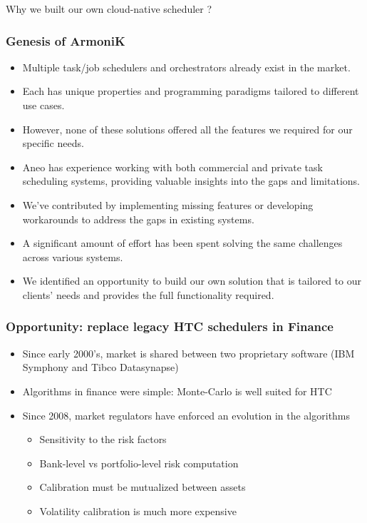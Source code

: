 \documentclass[10pt,aspectratio=1609]{beamer}
\begin{document}
\begin{section}{Why we built our own cloud-native scheduler ?}

  \begin{frame}
    \frametitle{Genesis of ArmoniK}
    \begin{itemize}
      \item Multiple task/job schedulers and orchestrators already exist in the market.
      \item Each has unique properties and programming paradigms tailored to different use cases.
      \item However, none of these solutions offered all the features we required for our specific needs.
      \item Aneo has experience working with both commercial and private task scheduling systems, providing valuable
      insights into the gaps and limitations.
      \item We’ve contributed by implementing missing features or developing workarounds to address the gaps in
      existing systems.
      \item A significant amount of effort has been spent solving the same challenges across various systems.
      \item We identified an opportunity to build our own solution that is tailored to our clients’ needs and provides the
      full functionality required.
    \end{itemize}
  \end{frame}

  \begin{frame}
    \frametitle{Opportunity: replace legacy HTC schedulers in Finance}
    \begin{itemize}
      \item Since early 2000's, market is shared between two proprietary software (IBM Symphony and Tibco Datasynapse)
      \item Algorithms in finance were simple: Monte-Carlo is well suited for HTC
      \item Since 2008, market regulators have enforced an evolution in the algorithms
      \begin{itemize}
        \item Sensitivity to the risk factors
        \item Bank-level vs portfolio-level risk computation
        \item Calibration must be mutualized between assets
        \item Volatility calibration is much more expensive
      \end{itemize}
    \end{itemize}
    

\end{frame}
\end{section}
\end{document}
